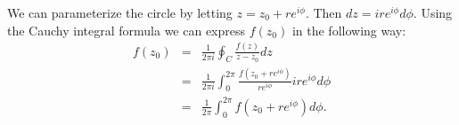 \documentclass[12pt]{article}
\begin{document}
We can parameterize the circle by letting $z=z_0 + r e^{i\phi}$.
Then $dz=ir e^{i\phi}d\phi$. Using the Cauchy integral formula we can express $f(z_0)$ in the following way:
\begin{eqnarray*}
f(z_0)&=&\frac{1}{2\pi i} \oint_{C} \frac{f(z)}{z-z_0}dz\\
&=&\frac{1}{2\pi i} \int_{0}^{2\pi} \frac{f(z_0 + r e^{i\phi})}{r e^{i\phi}} ir e^{i\phi} d\phi\\
&=&\frac{1}{2\pi} \int_{0}^{2\pi} f(z_0 + r e^{i\phi}) d\phi .
\end{eqnarray*}

\end{document}
